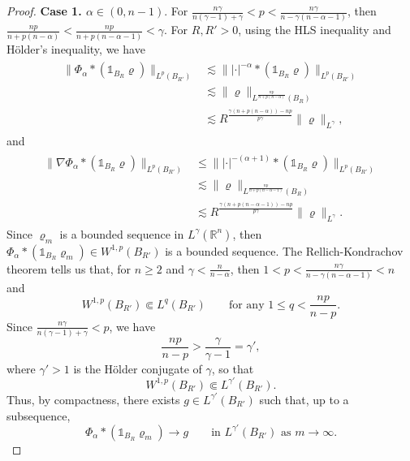 \documentclass[reqno,11pt]{amsart}
\numberwithin{equation}{section}
\theoremstyle{definition}
\begin{document}
\begin{proof}
\medskip
\noindent
{\bf Case 1. $\alpha \in (0,n-1)$}.
For $\frac{n\gamma}{n(\gamma - 1) + \gamma} < p < \frac{n \gamma}{n - \gamma(n - \alpha - 1)}$, 
then $\frac{np}{n + p(n-\alpha)} < \frac{np}{n + p(n-\alpha-1)} < \gamma$.
For $R, R' > 0$, using the HLS inequality and H\"older's inequality, we have
    \begin{align*}
  \begin{split}
   \|\Phi_\alpha * (\mathds{1}_{B_R} \varrho ) \|_{L^p(B_{R'})} & \lesssim \||\cdot|^{-\alpha} * (\mathds{1}_{B_R} \varrho ) \|_{L^p(B_{R'})} \\
  & \lesssim \|\varrho\|_{L^\frac{np}{n + p(n-\alpha)}(B_R)} \\
  & \lesssim R^\frac{\gamma(n + p(n-\alpha)) - np}{p\gamma} \|\varrho\|_{L^\gamma},
 \end{split}
    \end{align*}
    and
    \begin{align*}
 \begin{split}
 \|\nabla \Phi_\alpha * (\mathds{1}_{B_R} \varrho ) \|_{L^p(B_{R'})} & \leq \||\cdot|^{-(\alpha + 1)} * (\mathds{1}_{B_R} \varrho ) \|_{L^p(B_{R'})} \\
 & \lesssim \|\varrho\|_{L^\frac{np}{n + p(n-\alpha-1)}(B_R)} \\
& \lesssim R^\frac{\gamma(n + p(n - \alpha - 1)) - np}{p\gamma} \|\varrho\|_{L^\gamma}.
  \end{split}
    \end{align*}
Since $\varrho_m$ is a bounded sequence in $L^\gamma(\mathbb{R}^n)$, 
then $\Phi_\alpha * (\mathds{1}_{B_R} \varrho_m ) \in W^{1,p}(B_{R'})$ is a bounded sequence.
The Rellich-Kondrachov theorem tells us that, for $n \geq 2$ and $\gamma < \frac{n}{n-\alpha}$, 
then $1 < p < \frac{n \gamma}{n - \gamma(n - \alpha - 1)} < n$ and
    \[
 W^{1,p}(B_{R'}) \Subset L^q(B_{R'})\qquad \mbox{for any $1 \leq q < \frac{n p}{n - p}$}.
    \]
Since $\frac{n\gamma}{n(\gamma - 1) + \gamma} < p$, we have
    \[
 \frac{n p}{n - p} > \frac{\gamma}{\gamma - 1} = \gamma',
    \]
    where $\gamma' > 1$ is the H\"older conjugate of $\gamma$, so that
    \begin{equation*}
        W^{1,p}(B_{R'}) \Subset L^{\gamma'}(B_{R'}).
    \end{equation*}
    Thus, by compactness, there exists $g \in L^{\gamma'}(B_{R'})$ such that, up to a subsequence,
    \[
  \Phi_\alpha * (\mathds{1}_{B_R} \varrho_m ) \longrightarrow g
 \qquad \mbox{in $L^{\gamma'}(B_{R'})$ as $m \to \infty$}. 
    \]
   

\end{proof}
\end{document}
